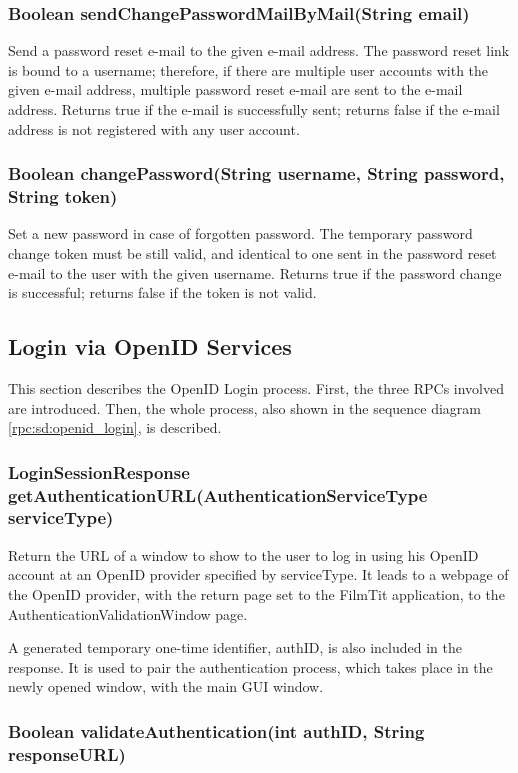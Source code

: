 \subsubsection{Boolean sendChangePasswordMailByMail(String email)}
Send a password reset e-mail to the given e-mail address.
The password reset link is bound to a username;
therefore, if there are multiple user accounts with the given e-mail address,
multiple password reset e-mail are sent to the e-mail address.
Returns true if the e-mail is successfully sent;
returns false if the e-mail address is not registered with any user account.

\subsubsection{Boolean changePassword(String username, String password, String token)}
Set a new password in case of forgotten password.
The temporary password change token must be still valid,
and identical to one sent in the password reset e-mail
to the user with the given username.
Returns true if the password change is successful;
returns false if the token is not valid.

\subsection{Login via OpenID Services}
\label{subsubsec:gui_openid}

This section describes the OpenID Login process. First, the three RPCs involved are introduced. Then, the whole process, also shown in the sequence diagram \ref{rpc:sd:openid_login}, is described.

\subsubsection{LoginSessionResponse getAuthenticationURL(AuthenticationServiceType serviceType)}

Return the URL of a window to show to the user to log in using his OpenID account at an OpenID provider specified by serviceType. It leads to a webpage of the OpenID provider, with the return page set to the FilmTit application, to the AuthenticationValidationWindow page.

A generated temporary one-time identifier, authID, is also included in the response. It is used to pair the authentication process, which takes place in the newly opened window, with the main GUI window.

\subsubsection{Boolean validateAuthentication(int authID, String responseURL)}

